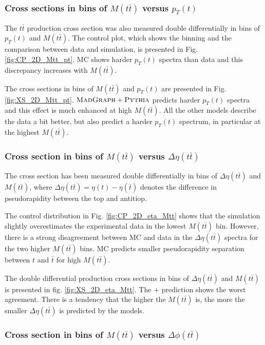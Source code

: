 \subsubsection{Cross sections in bins of $M(t\bar{t})$ versus $p_{T}(t)$}

The $t\bar{t}$ production cross section was also measured double differentially in bins of $p_{T}(t)$ and $M(t\bar{t})$.
The control plot, which shows the binning and the comparison between data and simulation, is presented in Fig. \ref{fig:CP_2D_Mtt_pt}. 
MC shows harder $p_{T}(t)$ spectra than data and this discrepancy increases with $M(t\bar{t})$.

The cross sections in bins of $M(t\bar{t})$ and $p_{T}(t)$ are presented in Fig. \ref{fig:XS_2D_Mtt_pt}. $\textsc{MadGraph}+\textsc{Pythia}$ predicts harder
$p_{T}(t)$ spectra and this effect is much enhanced at high $M(t\bar{t})$. All the other models describe the data a bit better, but 
also predict a harder $p_{T}(t)$ spectrum, in particular at the highest $M(t\bar{t})$.

\subsubsection{Cross section in bins of $M(t\bar{t})$ versus $\Delta\eta(t\bar{t})$}

The cross section has been measured double differentially in bins of $\Delta\eta(t\bar{t})$ and $M(t\bar{t})$, where $\Delta\eta(t\bar{t}) = \eta(t) - \eta(\bar{t})$
denotes the difference in pseudorapidity between the top and antitiop.

The control distribution in Fig. \ref{fig:CP_2D_eta_Mtt} shows that the simulation slightly overestimates the experimental data in the lowest $M(t\bar{t})$
bin. However, there is a strong disagreement between MC and data in the $\Delta\eta(t\bar{t})$ spectra for the two higher $M(t\bar{t})$ bins. MC predicts smaller
pseudorapidity separation between $t$ and $\bar{t}$ for high $M(t\bar{t})$.

The double differential production cross sections in bins of $\Delta\eta(t\bar{t})$ and $M(t\bar{t})$ is presented in fig. \ref{fig:XS_2D_eta_Mtt}. The \MG + \PYTHIA
prediction shows the worst agreement. There is a tendency that the higher the $M(t\bar{t})$ is, the more the smaller $\Delta\eta(t\bar{t})$ is predicted by
the models.

\subsubsection{Cross section in bins of $M(t\bar{t})$ versus $\Delta\phi(t\bar{t})$}

